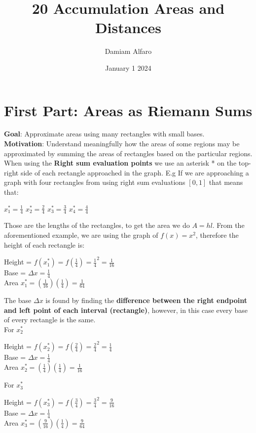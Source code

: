 \documentclass[12pt, letterpaper]{article}
\title{20 Accumulation Areas and Distances}
\author{Damiam Alfaro}
\date{January 1 2024}
\begin{document}
\maketitle

\section{First Part: Areas as Riemann Sums}
\textbf{Goal}: Approximate areas using many rectangles with small bases.\\
\newline
\textbf{Motivation}: Understand meaningfully how the areas of some regions may be approximated by summing the areas of rectangles based on the particular regions.\\
\newline
When using the \textbf{Right sum evaluation points} we use an asterisk * on the top-right side of each rectangle approached in the graph. E.g If we are approaching a graph with four rectangles from using right sum evaluations \([0,1]\) that means that:
\begin{center}
    \(x_1^*=\frac{1}{4}\)
    \(x_2^*=\frac{2}{4}\)
    \(x_3^*=\frac{3}{4}\)
    \(x_4^*=\frac{4}{4}\)
\end{center}
Those are the lengths of the rectangles, to get the area we do \(A = hl\). From the aforementioned example, we are using the graph of \(f(x)=x^2\), therefore the height of each rectangle is:
\begin{center}
    Height = \(f(x_1^*)=f(\frac{1}{4})=\frac{1}{4}^2=\frac{1}{16}\)\\
    Base = \(\Delta x = \frac{1}{4}\)\\
    Area \(x_1^*=(\frac{1}{16})(\frac{1}{4})=\frac{1}{64}\)
\end{center}
The base \(\Delta x\) is found by finding the \textbf{difference between the right endpoint and left point of each interval (rectangle)}, however, in this case every base of every rectangle is the same.\\
\newline
For \(x_2^*\)
\begin{center}
    Height = \(f(x_2^*)=f(\frac{2}{4})=\frac{2}{4}^2=\frac{1}{4}\)\\
    Base = \(\Delta x = \frac{1}{4}\)\\
    Area \(x_2^*=(\frac{1}{4})(\frac{1}{4})=\frac{1}{16}\)
\end{center}
For \(x_3^*\)
\begin{center}
    Height = \(f(x_3^*)=f(\frac{3}{4})=\frac{3}{4}^2=\frac{9}{16}\)\\
    Base = \(\Delta x = \frac{1}{4}\)\\
    Area \(x_3^*=(\frac{9}{16})(\frac{1}{4})=\frac{9}{64}\)
\end{center}
\end{document}
